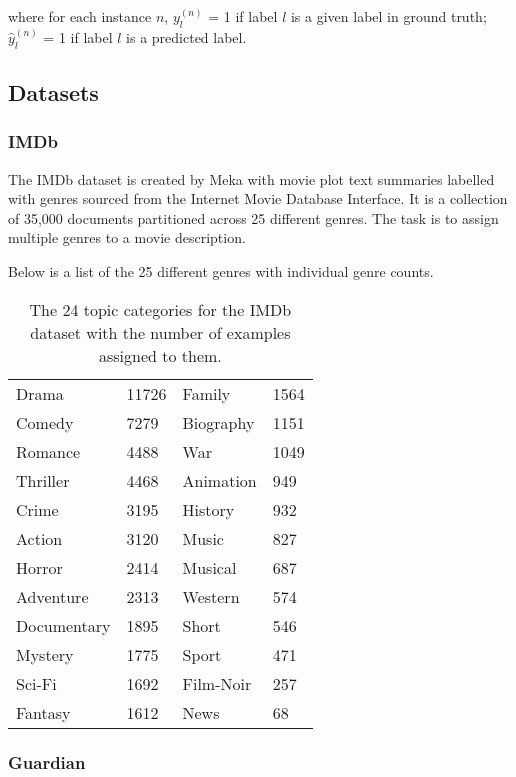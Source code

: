 \noindent where for each instance $n$, $y^{(n)}_{l}$ = 1 if label $l$ is a given label in ground truth; \\
$\hat{y}^{(n)}_{l}$ = 1 if label $l$ is a predicted label.
\newpage
\subsection{Datasets}

\subsubsection{IMDb}

The IMDb dataset is created by Meka with movie plot text summaries labelled with genres sourced from the Internet Movie Database Interface. It is a collection of 35,000 documents partitioned across 25 different genres. The task is to assign multiple genres to a movie description.

Below is a list of the 25 different genres with individual genre counts.

\begin{table}[htbp]
\begin{tabular}{ll|ll}
Drama       & 11726 & Family    & 1564 \\
Comedy      & 7279  & Biography & 1151 \\
Romance     & 4488  & War       & 1049 \\
Thriller    & 4468  & Animation & 949  \\
Crime       & 3195  & History   & 932  \\
Action      & 3120  & Music     & 827  \\
Horror      & 2414  & Musical   & 687  \\
Adventure   & 2313  & Western   & 574  \\
Documentary & 1895  & Short     & 546  \\
Mystery     & 1775  & Sport     & 471  \\
Sci-Fi      & 1692  & Film-Noir & 257  \\
Fantasy     & 1612  & News      & 68  
\end{tabular}
\caption{\label{tab:widgets}The 24 topic categories for the IMDb dataset with the number of examples assigned to them.}
\end{table}

\subsubsection{Guardian}

